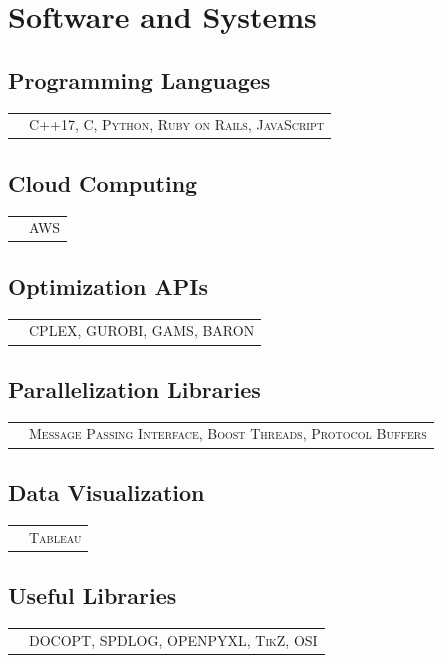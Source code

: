 \documentclass[10PT,letter]{article}
\newcommand{\subsectionstyle}[1]{\normalfont\selectfont\textcolor{titlecol}{\sffamily #1}}
\newcommand{\numbox}[1]{} %
\begin{document}
\section*{\numbox{9}\bfseries\textcolor{titlecol}{\sffamily Software and Systems}}
        	\subsection*{\subsectionstyle{Programming Languages}}
		            \begin{tabular}{p{0.2in}p{5.55in}}
		                & \textsc{C++17, C, Python, Ruby on Rails, JavaScript}
		            \end{tabular}
        
        \subsection*{\subsectionstyle{Cloud Computing}}
		        \begin{tabular}{p{.2in}p{5.55in}}
		        	 & \textsc{AWS}
		        \end{tabular}
    
   	  	\subsection*{\subsectionstyle{Optimization  APIs}}
			    \begin{tabular}{p{.2in}p{5.55in}}
			     	& 	\textsc{CPLEX, GUROBI, GAMS, BARON}
			    \end{tabular}
		 \subsection*{\subsectionstyle{Parallelization Libraries }}
				\begin{tabular}{p{.2in}p{5.55in}}
				 	& 	\textsc{Message Passing Interface, Boost Threads, Protocol Buffers}
				\end{tabular}

     	\subsection*{\subsectionstyle{Data Visualization}}
				\begin{tabular}{p{.2in}p{5.55in}}
					& \textsc{Tableau} 
				\end{tabular}
     	\subsection*{\subsectionstyle{Useful Libraries}}
				\begin{tabular}{p{.2in}p{5.55in}}
					& \textsc{DOCOPT,  SPDLOG, OPENPYXL, TikZ, OSI} 
				\end{tabular}
\end{document}
